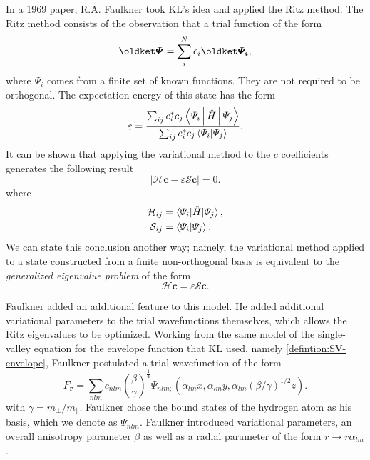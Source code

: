 In a 1969 paper\cite{Faulkner}, R.A. Faulkner took KL's idea and applied the
Ritz method. The Ritz method consists of the observation that a trial function
of the form
\begin{equation}
    \ket{\Psi} = \sum_{i}^{N} c_{i}\ket{\Psi_{i}},
\end{equation}
where $\Psi_{i}$ comes from a finite set of known functions. They are not
required to be orthogonal. The expectation energy of this state has the form
\begin{equation}
\varepsilon
    =
        \frac
        { \sum_{ij}c_{i}^{*}c_{j}\Braket{\Psi_{i} | \hat{H} | \Psi_{j}} }
        { \sum_{ij}c_{i}^{*}c_{j}\braket{\Psi_{i} | \Psi_{j}} }.
\end{equation}
It can be shown that applying the variational method to the $c$ coefficients
generates the following result
\begin{equation}
    \left|\mathcal{H}\bm{c}-\varepsilon\mathcal{S}\bm{c}\right| = 0.
\end{equation}
where
\begin{align}
    \mathcal{H}_{ij} &= \braket{\Psi_{i} | \hat{H} | \Psi_{j}}, \\
    \mathcal{S}_{ij} &= \braket{\Psi_{i} | \Psi_{j}}.
\end{align}
We can state this conclusion another way; namely, the variational method applied
to a state constructed from a finite non-orthogonal basis is equivalent to the
\emph{generalized eigenvalue problem} of the form
\begin{equation}
    \mathcal{H}\bm{c} = \varepsilon\mathcal{S}\bm{c}.
\end{equation}

Faulkner added an additional feature to this model. He added additional
variational parameters to the trial wavefunctions themselves, which allows the
Ritz eigenvalues to be optimized. Working from the same model of the
single-valley equation for the envelope function that KL used, namely
\eqref{defintion:SV-envelope}, Faulkner postulated a trial wavefunction of the
form
\begin{equation}
F_{\bm{r}}
    =
        \sum_{nlm} c_{nlm}\left(\frac{\beta}{\gamma}\right)^{\frac{1}{4}}
        \Psi_{nlm;}\left(
            \alpha_{lm}x,\alpha_{lm}y,
            \alpha_{lm}\left(\beta/\gamma\right)^{1/2}z
        \right)
.
\end{equation}
with $\gamma = m_{\perp} / m_{\parallel}$. Faulkner chose the bound states of
the hydrogen atom as his basis, which we denote as $\Psi_{nlm}$. Faulkner
introduced variational parameters, an overall anisotropy parameter $\beta$ as
well as a radial parameter of the form $r \rightarrow r\alpha_{lm}$. 

